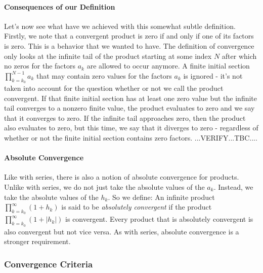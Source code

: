 \paragraph{Consequences of our Definition}
Let's now see what have we achieved with this somewhat subtle definition. Firstly, we note that a convergent product is zero if and only if one of its factors is zero. This is a behavior that we wanted to have. The definition of convergence only looks at the infinite tail of the product starting at some index $N$ after which no zeros for the factors $a_k$ are allowed to occur anymore. A finite initial section $\prod_{k=k_0}^{N-1} a_k$ that may contain zero values for the factors $a_k$ is ignored - it's not taken into account for the question whether or not we call the product convergent. If that finite initial section has at least one zero value but the infinite tail converges to a nonzero finite value, the product evaluates to zero and we say that it converges to zero. If the infinite tail approaches zero, then the product also evaluates to zero, but this time, we say that it diverges to zero - regardless of whether or not the finite initial section contains zero factors. ...VERIFY...TBC....

\paragraph{Absolute Convergence}
Like with series, there is also a notion of absolute convergence for products. Unlike with series, we do not just take the absolute values of the $a_k$. Instead, we take the absolute values of the $h_k$. So we define: An infinite product $\prod_{k=k_0}^{\infty} (1 + h_k)$ is said to be \emph{absolutely convergent} if the product $\prod_{k=k_0}^{\infty} (1 + |h_k|)$ is convergent. Every product that is absolutely convergent is also convergent but not vice versa. As with series, absolute convergence is a stronger requirement.









\subsubsection{Convergence Criteria}

